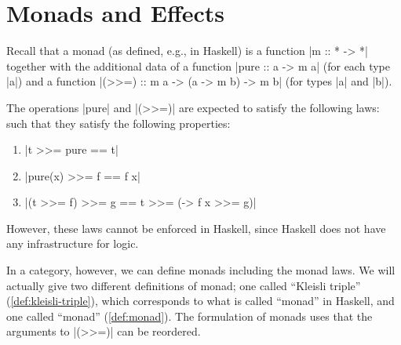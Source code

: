 
\section{Monads and Effects}
\label{sec:monads}
Recall that a monad (as defined, e.g., in Haskell) is a function |m :: * -> *| together with the additional data of a function |pure :: a -> m a| (for each type |a|) and a function |(>>=) :: m a -> (a -> m b) -> m b| (for types |a| and |b|).

The operations |pure| and |(>>=)| are expected to satisfy the following laws:
such that they satisfy the following properties:
\begin{enumerate}
\item |t >>= pure == t| %
\item |pure(x) >>= f == f x| %
\item |(t >>= f) >>= g == t >>= (\x -> f x >>= g)|%
\end{enumerate}
However, these laws cannot be enforced in Haskell, since Haskell does not have any infrastructure for logic.

In a category, however, we can define monads including the monad laws.
We will actually give two different definitions of monad;
one called ``Kleisli triple'' (\cref{def:kleisli-triple}), which corresponds to what is called ``monad'' in Haskell,
and one called ``monad'' (\cref{def:monad}). 
The formulation of monads uses that the arguments to |(>>=)| can be reordered.

